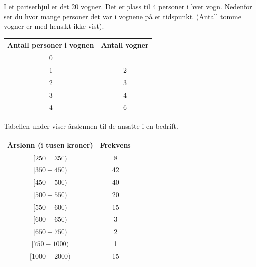 I et pariserhjul er det 20 vogner. Det er plass til 4 personer i hver vogn.
Nedenfor ser du hvor mange personer det var i vognene på et tidspunkt. (Antall tomme vogner er med hensikt ikke vist).

\begin{table}[h]
	\centering
	\begin{tabular}{|c|c|}
		\hline 
		\textbf{Antall personer i vognen} & \textbf{Antall vogner} \\
		\hline
		0 & \\ \hline
		1 & 2 \\ \hline
		2 & 3 \\ \hline
		3 & 4 \\ \hline
		4 & 6 \\ \hline
	\end{tabular}
\end{table}


Tabellen under viser årslønnen til de ansatte i en bedrift.
\begin{center}
	\small
	\begin{tabular}{|c|c|}
		\hline
		Årslønn (i tusen kroner) & Frekvens \\ \hline
		$[250 - 350)$ & 8  \\ \hline
		$[350 - 450)$ & 42 \\ \hline
		$[450 - 500)$ & 40 \\ \hline
		$[500 - 550)$ & 20 \\ \hline
		$[550 - 600)$ & 15 \\ \hline
		$[600 - 650)$ & 3  \\ \hline
		$[650 - 750)$ & 2  \\ \hline
		$[750 - 1000)$ & 1 \\ \hline
		$[1000 - 2000)$ & 15 \\ \hline
	\end{tabular}
\end{center}

